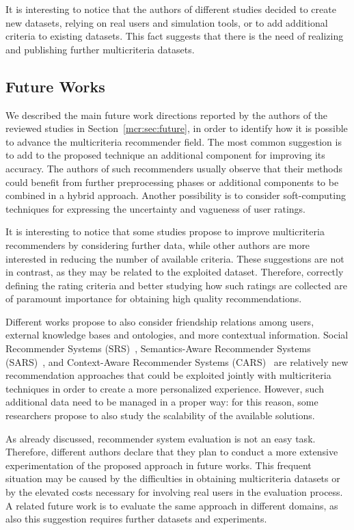 It is interesting to notice that the authors of different studies decided to create new datasets, relying on real users and simulation tools, or to add additional criteria to existing datasets. This fact suggests that there is the need of realizing and publishing further multicriteria datasets.

\subsection{Future Works}

We described the main future work directions reported by the authors of the reviewed studies in Section~\ref{mcr:sec:future}, in order to identify how it is possible to advance the multicriteria recommender field. The most common suggestion is to add to the proposed technique an additional component for improving its accuracy. The authors of such recommenders usually observe that their methods could benefit from further preprocessing phases or additional components to be combined in a hybrid approach. Another possibility is to consider soft-computing techniques for expressing the uncertainty and vagueness of user ratings.

It is interesting to notice that some studies propose to improve multicriteria recommenders by considering further data, while other authors are more interested in reducing the number of available criteria. These suggestions are not in contrast, as they may be related to the exploited dataset. Therefore, correctly defining the rating criteria and better studying how such ratings are collected are of paramount importance for obtaining high quality recommendations.

Different works propose to also consider friendship relations among users, external knowledge bases and ontologies, and more contextual information. Social Recommender Systems (SRS)~\cite{Guy2015}, Semantics-Aware Recommender Systems (SARS)~\cite{Gemmis2015a}, and Context-Aware Recommender Systems (CARS)~\cite{Adomavicius2015a} are relatively new recommendation approaches that could be exploited jointly with multicriteria techniques in order to create a more personalized experience. However, such additional data need to be managed in a proper way: for this reason, some researchers propose to also study the scalability of the available solutions.

As already discussed, recommender system evaluation is not an easy task. Therefore, different authors declare that they plan to conduct a more extensive experimentation of the proposed approach in future works. This frequent situation may be caused by the difficulties in obtaining multicriteria datasets or by the elevated costs necessary for involving real users in the evaluation process. A related future work is to evaluate the same approach in different domains, as also this suggestion requires further datasets and experiments.


